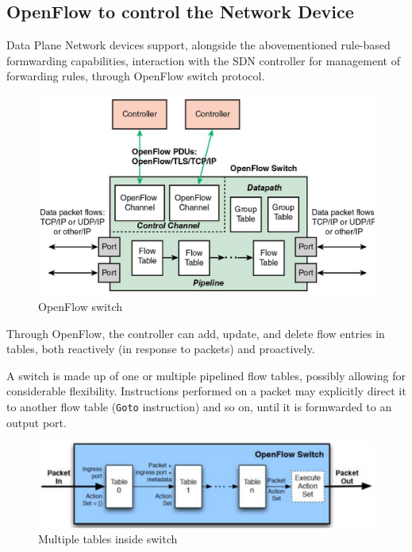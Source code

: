 \subsection{OpenFlow to control the Network Device}
Data Plane Network devices support, alongside the abovementioned rule-based formwarding capabilities, interaction with the SDN controller for management of forwarding rules, through OpenFlow switch protocol.

\begin{figure}[htbp]
   \centering
   \includegraphics{images/openflow_switch.png}
   \caption{OpenFlow switch}
   \label{fig:openflow_switch}
\end{figure}
Through OpenFlow, the controller can add, update, and delete flow
entries in tables, both reactively (in response to packets) and
proactively.

A switch is made up of one or multiple pipelined flow tables, possibly allowing for considerable flexibility.
Instructions performed on a packet may explicitly direct it to another flow table (\texttt{Goto} instruction) and so on, until it is formwarded to an output port.
\begin{figure}[htbp]
   \centering
   \includegraphics{images/openflow_switchtables.png}
   \caption{Multiple tables inside switch}
   \label{fig:openflow_switchtables}
\end{figure}


